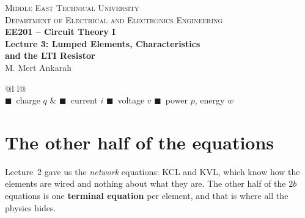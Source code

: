 \documentclass[11pt,a4paper]{article}
\newcommand{\Icol}[1]{\textcolor{ccur}{#1}}
\newcommand{\Vcol}[1]{\textcolor{cvolt}{#1}}
\newcommand{\Pcol}[1]{\textcolor{cpow}{#1}}
\newcommand{\Qcol}[1]{\textcolor{ccharge}{#1}}
\begin{document}
\begin{center}
\begin{tcolorbox}[enhanced, colback=metured!5, colframe=metured, boxrule=1pt,
                  arc=3pt, left=10pt,right=10pt,top=7pt,bottom=7pt, width=\textwidth]
\begin{center}
  {\small\scshape Middle East Technical University}\\[2pt]
  {\small\scshape Department of Electrical and Electronics Engineering}\\[7pt]
  {\Large\bfseries\color{metured} EE201 -- Circuit Theory I}\\[4pt]
  {\large\bfseries Lecture 3: Lumped Elements, Characteristics\\ and the LTI Resistor}\\[6pt]
  {\small M. Mert Ankaralı}
\end{center}
\end{tcolorbox}
\end{center}
\vspace{-0.5em}

\begin{center}
\small
\begin{tabular}{@{}l l@{}}
\toprule
{}\\
\midrule
\Qcol{$\blacksquare$}~charge $q$ & \Icol{$\blacksquare$}~current $i$ \quad
\Vcol{$\blacksquare$}~voltage $v$ \quad \Pcol{$\blacksquare$}~power $p$, energy $w$\\
\bottomrule
\end{tabular}
\end{center}

\section{The other half of the equations}

Lecture~2 gave us the \emph{network} equations: KCL and KVL, which know how the elements
are wired and nothing about what they are. The other half of the $2b$ equations is one
\textbf{terminal equation} per element, and that is where all the physics hides.

\begin{center}
\end{center}
\end{document}
